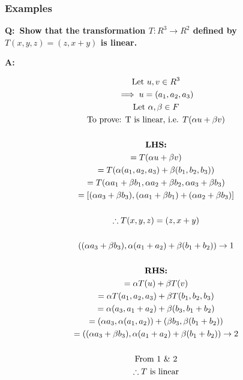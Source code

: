 \documentclass[english,course,fleqn]{lecture}
\newenvironment{qanda}{\setlength{\parindent}{0pt}}{\bigskip}
\newcommand{\Q}{\bigskip\bfseries Q:\ }
\newcommand{\A}{\par\textbf{A:} \normalfont}
\begin{document}
\subsubsection{Examples}

\begin{qanda}

	\Q Show that the transformation $T:R^{3} \rightarrow R^{2}$ defined by $T(x,y,z) = (z,x+y)$ is linear.

	\A

	\begin{gather*}
		\text{Let }u,v \in R^{3}\\
		\implies u = (a_{1}, a_{2}, a_{3})\\
		\text{Let }\alpha,\beta \in F\\
		\text{To prove: T is linear, i.e. }T(\alpha u + \beta v)\\\\
		\textrm{\textbf{LHS:}}\\
		= T(\alpha u + \beta v)\\
		= T(\alpha(a_{1}, a_{2}, a_{3}) + \beta(b_{1}, b_{2}, b_{3}))\\
		= T(\alpha a_{1} + \beta b_{1}, \alpha a_{2} + \beta b_{2}, \alpha a_{3} + \beta b_{3})\\
		= [(\alpha a_{3} + \beta b_{3}), (\alpha a_{1} + \beta b_{1}) + (\alpha a_{2} + \beta b_{3})]\\
		\\
		\therefore T(x,y,z) = (z, x + y)\\
		\\
		((\alpha a_{3} + \beta b_{3}), \alpha (a_{1} + a_{2}) + \beta(b_{1} + b_{2})) \rightarrow 1\\
		\\
		\text{\textbf{RHS:}}\\
		= \alpha T(u) + \beta T (v)\\
		= \alpha T(a_{1}, a_{2}, a_{3}) + \beta T(b_{1}, b_{2}, b_{3})\\
		= \alpha(a_{3}, a_{1} + a_{2}) + \beta (b_{3}, b_{1} + b_{2})\\
		= (\alpha a_{3}, \alpha (a_{1}, a_{2})) + (\beta b_{3}, \beta (b_{1} + b_{2}))\\
		= ((\alpha a_{3} + \beta b_{3}), \alpha (a_{1} + a_{2}) + \beta (b_{1} + b_{2})) \rightarrow 2\\
		\\
		\text{From 1 \& 2}\\
		\therefore T \text{ is linear}
	\end{gather*}


\end{qanda}
\end{document}
